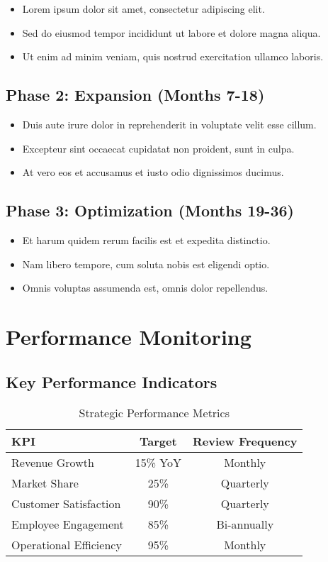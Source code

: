 \documentclass[11pt,a4paper]{article}
\begin{document}
\begin{itemize}
  \item Lorem ipsum dolor sit amet, consectetur adipiscing elit.
  \item Sed do eiusmod tempor incididunt ut labore et dolore magna aliqua.
  \item Ut enim ad minim veniam, quis nostrud exercitation ullamco laboris.
\end{itemize}

\subsection{Phase 2: Expansion (Months 7-18)}

\begin{itemize}
  \item Duis aute irure dolor in reprehenderit in voluptate velit esse cillum.
  \item Excepteur sint occaecat cupidatat non proident, sunt in culpa.
  \item At vero eos et accusamus et iusto odio dignissimos ducimus.
\end{itemize}

\subsection{Phase 3: Optimization (Months 19-36)}

\begin{itemize}
  \item Et harum quidem rerum facilis est et expedita distinctio.
  \item Nam libero tempore, cum soluta nobis est eligendi optio.
  \item Omnis voluptas assumenda est, omnis dolor repellendus.
\end{itemize}

\section{Performance Monitoring}

\subsection{Key Performance Indicators}

\begin{table}[h]
\centering
\begin{tabular}{|l|c|c|}
\hline
\textbf{KPI} & \textbf{Target} & \textbf{Review Frequency} \\
\hline
Revenue Growth & 15\% YoY & Monthly \\
\hline
Market Share & 25\% & Quarterly \\
\hline
Customer Satisfaction & 90\% & Quarterly \\
\hline
Employee Engagement & 85\% & Bi-annually \\
\hline
Operational Efficiency & 95\% & Monthly \\
\hline
\end{tabular}
\caption{Strategic Performance Metrics}
\end{table}
\end{document}
